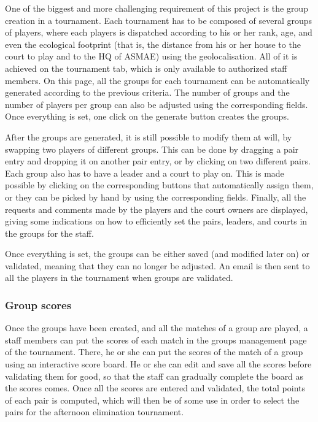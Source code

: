 One of the biggest and more challenging requirement of this project is the
group creation in a tournament. Each tournament has to be composed of
several groups of players, where each players is dispatched according to
his or her rank, age, and even the ecological footprint (that is, the distance
from his or her house to the court to play and to the HQ of ASMAE)
using the geolocalisation. All of it is achieved on the tournament tab, which is
only available to authorized staff members. On this page, all the
groups for each tournament can be automatically generated according to the
previous criteria. The number of groups and the number of players per group
can also be adjusted using the corresponding fields. Once everything is set,
one click on the generate button creates the groups. \newline

After the groups are generated, it is still possible to modify them at will, by
swapping two players of different groups. This can be done by dragging a pair
entry and dropping it on another pair entry, or by clicking on two different
pairs. Each group also has to have a leader and a court to play on.
This is made possible by clicking on the corresponding buttons that
automatically assign them, or they can be picked by hand by using the
corresponding fields. Finally, all the requests and comments made by the
players and the court owners are displayed, giving some indications on how
to efficiently set the pairs, leaders, and courts in the groups for the staff.
\newline

Once everything is set, the groups can be either saved (and modified later on)
or validated, meaning that they can no longer be adjusted. An email is then
sent to all the players in the tournament when groups are validated.

\subsubsection{Group scores}
\label{subs:Group scores}

Once the groups have been created, and all the matches of a group are played,
a staff members can put the scores of each match in the groups
management page of the tournament. There, he or she can put the scores of the
match of a group using an interactive score board. He or she can edit and save
all the scores before validating them for good, so that the staff can gradually
complete the board as the scores comes. Once all the scores are entered and
validated, the total points of each pair is computed, which will then be of
some use in order to select the pairs for the afternoon elimination tournament.
\newline

